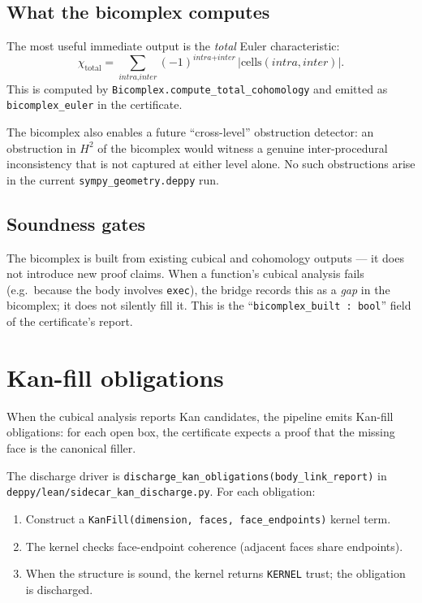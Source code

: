 \subsection{What the bicomplex computes}

The most useful immediate output is the \emph{total} Euler
characteristic:
\[
  \chi_{\text{total}} = \sum_{\textit{intra}, \textit{inter}}
                        (-1)^{\textit{intra}+\textit{inter}}\,
                        |\text{cells}(\textit{intra}, \textit{inter})|.
\]
This is computed by
\texttt{Bicomplex.compute\_total\_cohomology} and emitted as
\texttt{bicomplex\_euler} in the certificate.

The bicomplex also enables a future ``cross-level'' obstruction
detector: an obstruction in $H^2$ of the bicomplex would witness a
genuine inter-procedural inconsistency that is not captured at
either level alone.  No such obstructions arise in the current
\texttt{sympy\_geometry.deppy} run.

\subsection{Soundness gates}

The bicomplex is built from existing cubical and cohomology
outputs --- it does not introduce new proof claims.  When a
function's cubical analysis fails (e.g.\ because the body involves
\texttt{exec}), the bridge records this as a \emph{gap} in the
bicomplex; it does not silently fill it.  This is the
``\texttt{bicomplex\_built : bool}'' field of the certificate's
report.

\section{Kan-fill obligations}
\label{sec:kan-fill}

When the cubical analysis reports Kan candidates, the pipeline
emits Kan-fill obligations: for each open box, the certificate
expects a proof that the missing face is the canonical filler.

The discharge driver is
\texttt{discharge\_kan\_obligations(body\_link\_report)} in
\texttt{deppy/lean/sidecar\_kan\_discharge.py}.  For each
obligation:
\begin{enumerate}[leftmargin=1.7em]
  \item Construct a \texttt{KanFill(dimension, faces,
    face\_endpoints)} kernel term.
  \item The kernel checks face-endpoint coherence (adjacent faces
    share endpoints).
  \item When the structure is sound, the kernel returns
    \texttt{KERNEL} trust; the obligation is discharged.
\end{enumerate}

